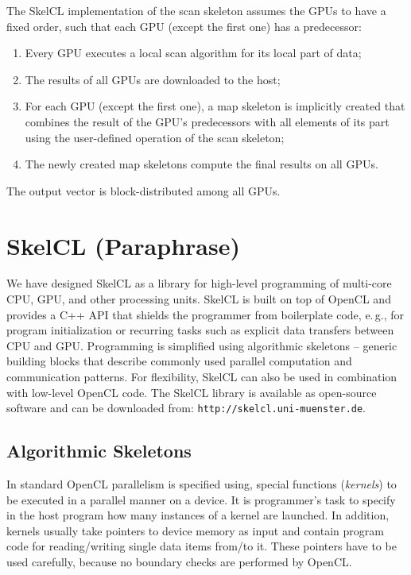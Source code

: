 The SkelCL implementation of the scan skeleton assumes the GPUs to have a fixed order, such that each GPU (except the first one) has a predecessor:
\begin{enumerate}
 \item Every GPU executes a local scan algorithm for its local part of data;
 \item The results of all GPUs are downloaded to the host;
 \item For each GPU (except the first one), a map skeleton is implicitly created that combines the result of the GPU's predecessors with all elements of its part using the user-defined operation of the scan skeleton;
 \item The newly created map skeletons compute the final results on all GPUs.
\end{enumerate}
The output vector is block-distributed among all GPUs.




\section{SkelCL (Paraphrase)}

We have designed SkelCL as a library for high-level programming of multi-core CPU, GPU, and other processing units.
SkelCL is built on top of OpenCL and provides a C++ API that shields the programmer from boilerplate code, e.\,g., for program initialization or recurring tasks such as explicit data transfers between CPU and GPU.
Programming is simplified using algorithmic skeletons -- generic building blocks that describe commonly used parallel computation and communication patterns.
For flexibility, SkelCL can also be used in combination with low-level OpenCL code.
The SkelCL library is available as open-source software and can be downloaded from: \texttt{http://skelcl.uni-muenster.de}.

\subsection{Algorithmic Skeletons}

In standard OpenCL parallelism is specified using, special functions (\emph{kernels}) to be executed in a parallel manner on a device.
It is programmer's  task to specify in the  host program how many instances of a kernel are launched.
In addition, kernels usually take pointers to device memory as input and contain program code for reading/writing single data items from/to it.
These pointers have to be used carefully, because no boundary checks are performed by OpenCL.


